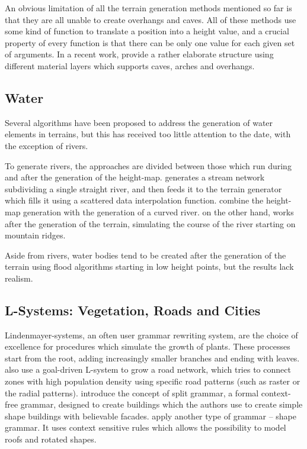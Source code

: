 \documentclass{acmtog}
\begin{document}
An obvious limitation of all the terrain generation methods mentioned so far is that they are all unable to create overhangs and caves. All of these methods use some kind of function to translate a position into a height value, and a crucial property of every function is that there can be only one value for each given set of arguments. In a recent work, \cite{Peytavie09} provide a rather elaborate structure using different material layers which supports caves, arches and overhangs.

\subsection{Water}
Several algorithms have been proposed to address the generation of water elements in terrains, but this has received too little attention to the date, with the exception of rivers.

To generate rivers, the approaches are divided between those which run during and after the generation of the height-map. \cite{Kelley88} generates a stream network subdividing a single straight river, and then feeds it to the terrain generator which fills it using a scattered data interpolation function. \cite{Prusinkiewicz93} combine the height-map generation with the generation of a curved river. \cite{Belhadj05} on the other hand, works after the generation of the terrain, simulating the course of the river starting on mountain ridges.

Aside from rivers, water bodies tend to be created after the generation of the terrain using flood algorithms starting in low height points, but the results lack realism.

\subsection{L-Systems: Vegetation, Roads and Cities}
Lindenmayer-systems, an often user grammar rewriting system, are the choice of excellence for procedures which simulate the growth of plants. These processes start from the root, adding increasingly smaller branches and ending with leaves. \cite{Parish01} also use a goal-driven L-system to grow a road network, which tries to connect zones with high population density using specific road patterns (such as raster or the radial patterns). \cite{Wonka03} introduce the concept of split grammar, a formal context-free grammar, designed to create buildings which the authors use to create simple shape buildings with believable facades. \cite{Muller06} apply another type of grammar -- shape grammar. It uses context sensitive rules which allows the possibility to model roofs and rotated shapes.
\end{document}
